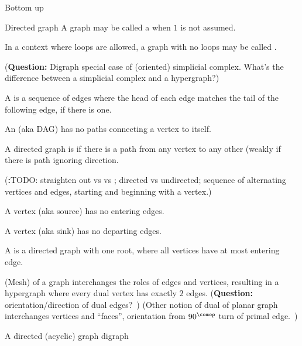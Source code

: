 \begin{plSection}{Bottom up}
\begin{plSection}{Directed graph}
A graph may be called a  when $1$ is
not assumed.

In a context where loops are allowed,
a graph with no loops may be called 
.

(\textbf{Question:} 
Digraph special case of (oriented) simplicial complex.
What's the difference between a simplicial complex 
and a hypergraph?)

A  is a sequence of edges where the head of each
edge matches the tail of the following edge, if there is one.

An  (aka DAG) has no paths
connecting a vertex to itself.

A directed graph is 
if there is a path
from any vertex to any other (weakly if there is path
ignoring direction.

(\textbf:{TODO:} straighten out  vs  vs
; directed vs undirected; sequence of alternating
vertices and edges, starting and beginning with a vertex.)

A  vertex (aka source) has no entering edges.

A  vertex (aka sink) has no departing edges.

A  is a directed graph with one root, 
where all vertices have at most entering edge.

(Mesh)  of a graph interchanges the roles of edges 
and vertices, resulting in a hypergraph where every dual vertex
has exactly $2$ edges. 
(\textbf{Question:} orientation/direction 
of dual edges?~\cite{Rusnak:2012:OrientedHyperGraphs})
(Other notion of dual of planar graph interchanges 
vertices and ``faces'',
orientation from $90^{\comop}$ 
turn of primal edge.~\cite{wiki:DualGraph})

\begin{plDiagram}[nofloat]
{A directed (acyclic) graph}
{digraph}
\centering
{}
\end{plDiagram}


\end{plSection}
\end{plSection}
